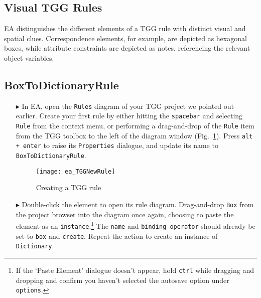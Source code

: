 \newpage
\hypertarget{rules vis}{}
\subsection{Visual TGG Rules}
\visHeader

EA distinguishes the different elements of a TGG rule with distinct visual and spatial clues. Correspondence elements, for example, are depicted as
hexagonal boxes, while attribute constraints are depicted as notes, referencing the relevant object variables.

\subsection{BoxToDictionaryRule}

\begin{enumerate}

\item[$\blacktriangleright$] In EA, open the \texttt{Rules} diagram of your TGG project we pointed out earlier. Create your first rule by either hitting the
\texttt{spacebar} and selecting \texttt{Rule} from the context menu, or performing a drag-and-drop of the \texttt{Rule} item from the TGG toolbox to the left of
the diagram window (Fig.~\ref{ea:create_tgg_rule}). Press \texttt{alt + enter} to raise its \texttt{Properties} dialogue, and update its name to
\texttt{BoxToDictionaryRule}.

\vspace{0.5cm}

\begin{figure}[htbp]
\begin{center}
  \texttt{[image: ea\_TGGNewRule]}
  \caption{Creating a TGG rule}
  \label{ea:create_tgg_rule}
\end{center}
\end{figure}

\vspace{0.5cm}

\item[$\blacktriangleright$] Double-click the element to open its rule diagram. Drag-and-drop \texttt{Box} from the project browser into the diagram once
again, choosing to paste the element as an \texttt{instance}.\footnote{If the `Paste Element' dialogue doesn't appear, hold \texttt{ctrl} while dragging and
dropping and confirm you haven't selected the autosave option under \texttt{options}.} The \texttt{name} and \texttt{binding operator} should already be set to
\texttt{box} and \texttt{create}. Repeat the action to create an instance of \texttt{Dictionary}.


\end{enumerate}
